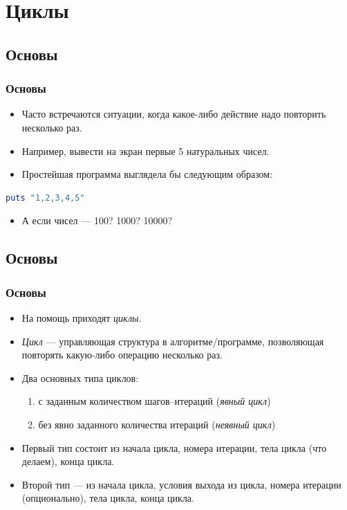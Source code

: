 \documentclass[compress,red]{beamer}
\begin{document}
\section{Циклы}
\subsection{Основы}
\begin{frame}[fragile]
  \frametitle{Основы}
		\begin{itemize}
  		\item Часто встречаются ситуации, когда какое-либо действие надо повторить несколько раз.
  		\item Например, вывести на экран первые 5 натуральных чисел.
  		\item Простейшая программа выглядела бы следующим образом:
  	\end{itemize}
  	
    \begin{lstlisting}[language=ruby,label=ruby3,caption=5 последовательных чисел]
      puts "1,2,3,4,5"
    \end{lstlisting}		
    
		\begin{itemize}
  	  \item А если чисел — 100? 1000? 10000?
		\end{itemize}
\end{frame}

\subsection{Основы}
\begin{frame}[fragile]
  \frametitle{Основы}
		\begin{itemize}
  		\item На помощь приходят \emph{циклы}.
  		\item \emph{Цикл} --- управляющая структура в алгоритме/программе, позволяющая повторять какую-либо операцию несколько раз.
  		\item Два основных типа циклов:
  		  \begin{enumerate}
  		    \item с заданным количеством шагов--итераций (\emph{явный цикл})
  		    \item без явно заданного количества итераций (\emph{неявный цикл})
  		  \end{enumerate}
  		\item Первый тип состоит из начала цикла, номера итерации, тела цикла (что делаем), конца цикла.
  		\item Второй тип — из начала цикла, условия выхода из цикла, номера итерации (опционально), тела цикла, конца цикла.
  	\end{itemize}
\end{frame}
\end{document}
